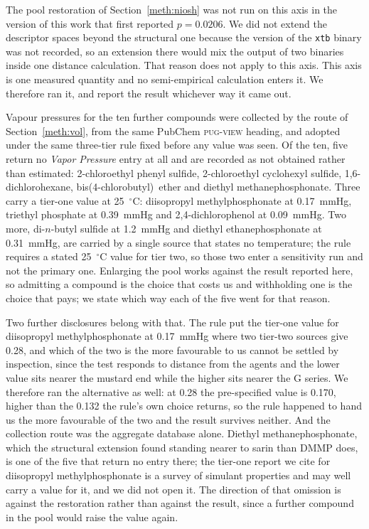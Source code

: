 \documentclass[11pt,a4paper]{article}
\begin{document}
The pool restoration of Section~\ref{meth:niosh} was not run on this axis in
the version of this work that first reported $p = 0.0206$. We did not extend the
descriptor spaces beyond the structural one because the version of the
\texttt{xtb} binary was not recorded, so an extension there would mix the
output of two binaries inside one distance calculation. That reason does not
apply to this axis. This axis is one measured quantity and no semi-empirical calculation
enters it. We therefore ran it, and report the result whichever way it came
out.

Vapour pressures for the ten further compounds were collected by the route of
Section~\ref{meth:vol}, from the same PubChem \textsc{pug-view} heading, and
adopted under the same three-tier rule fixed before any value was seen. Of the
ten, five return no \textit{Vapor Pressure} entry at all and are recorded as
not obtained rather than estimated: 2-chloroethyl phenyl sulfide,
2-chloroethyl cyclohexyl sulfide, 1,6-dichlorohexane,
bis(4-chlorobutyl)~ether and diethyl methanephosphonate. Three carry a
tier-one value at 25~$^{\circ}$C: diisopropyl methylphosphonate at
0.17~mmHg, triethyl phosphate at 0.39~mmHg and 2,4-dichlorophenol at
0.09~mmHg. Two more, di-$n$-butyl sulfide at 1.2~mmHg and diethyl
ethanephosphonate at 0.31~mmHg, are carried by a single source that states no
temperature; the rule requires a stated 25~$^{\circ}$C value for tier two, so
those two enter a sensitivity run and not the primary one. Enlarging the pool
works against the result reported here, so admitting a compound is the choice
that costs us and withholding one is the choice that pays; we state which way
each of the five went for that reason.

Two further disclosures belong with that. The rule put the tier-one value for
diisopropyl methylphosphonate at 0.17~mmHg where two tier-two sources give
0.28, and which of the two is the more favourable to us cannot be settled by
inspection, since the test responds to distance from the agents and the lower
value sits nearer the mustard end while the higher sits nearer the G series. We
therefore ran the alternative as well: at 0.28 the pre-specified value is
0.170, higher than the 0.132 the rule's own choice returns, so the rule
happened to hand us the more favourable of the two and the result survives
neither. And the collection route was the aggregate database alone. Diethyl
methanephosphonate, which the structural extension found standing nearer to
sarin than DMMP does, is one of the five that return no entry there; the
tier-one report we cite for diisopropyl methylphosphonate is a survey of
simulant properties and may well carry a value for it, and we did not open it.
The direction of that omission is against the restoration rather than against
the result, since a further compound in the pool would raise the value
again.
\end{document}
